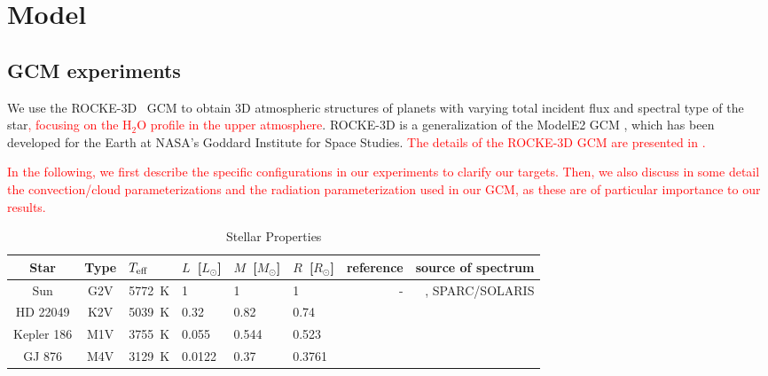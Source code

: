 \documentclass[11pt,numberedappendix,twocolappendix,]{emulateapj}
\def\water{H$_2$O}
\def\modelE{ROCKE-3D}
\def\addYF#1{\textcolor{red}{#1}}
\begin{document}
\section{Model}
\label{s:model}

\subsection{GCM experiments}

We use the \modelE{} \ GCM \citep{Way2017} to obtain 3D atmospheric structures of planets with varying total incident flux and spectral type of the star\addYF{, focusing on the \water{} profile in the upper atmosphere}. 
\modelE{} is a generalization of the ModelE2 GCM \citep{Schmidt2014}, which has been developed for the Earth at NASA's Goddard Institute for Space Studies. 
%
\addYF{The details of the ROCKE-3D GCM are presented in \citet{Way2017}.}

\addYF{In the following, we first describe the specific configurations in our experiments to clarify our targets. Then, we also discuss in some detail the convection/cloud parameterizations and the radiation parameterization used in our GCM, as these are of particular importance to our results. }
%



\begin{table}[!btp]
\caption{Stellar Properties}
\begin{center}
\begin{tabular}{ccllllrr} \hline \hline
%
Star & Type & $T_{\rm eff}$ & $L$~[$L_{\odot}$] & $M$~[$M_{\odot}$] & $R$~[$R_{\odot}$] & reference & source of spectrum \\ \hline
%
Sun & G2V & 5772~K & 1 & 1 & 1 & - & \citet{Lean2005}, SPARC/SOLARIS\footnotemark[1] \\ 
%
HD 22049 & K2V & 5039~K & 0.32 & 0.82 & 0.74 & \citet{Baines2012} & \citet{Segura2003} \\
%
Kepler 186 & M1V & 3755~K & 0.055 & 0.544 & 0.523 & \citet{Torres2015} & \citet{Allard2012} \\
%
GJ 876 & M4V & 3129~K & 0.0122 & 0.37 & 0.3761 & \citet{vonBraun2014} & \citet{Domagal-Goldman2014} \\ \hline
\end{tabular}
\end{center}
\label{tbl:stellar_properties}
\end{table}%
\end{document}
